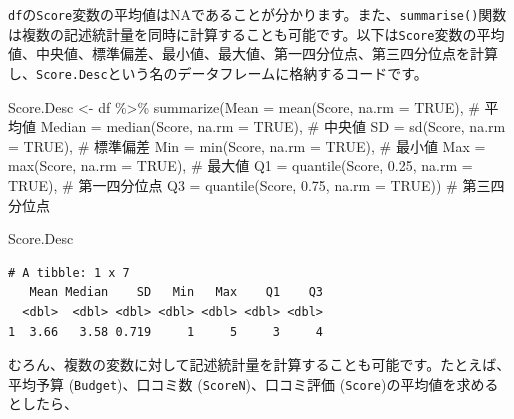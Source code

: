 \documentclass[
  a4paper,
  pandoc,
  ja=standard,
  jafont=haranoaji]{bxjsbook}
\newenvironment{Shaded}{\begin{snugshade}}{\end{snugshade}}
\newcommand{\AttributeTok}[1]{\textcolor[rgb]{0.00,0.48,0.65}{#1}}
\newcommand{\CommentTok}[1]{\textcolor[rgb]{0.37,0.37,0.37}{#1}}
\newcommand{\ConstantTok}[1]{\textcolor[rgb]{0.56,0.35,0.01}{#1}}
\newcommand{\FloatTok}[1]{\textcolor[rgb]{0.68,0.00,0.00}{#1}}
\newcommand{\FunctionTok}[1]{\textcolor[rgb]{0.28,0.35,0.67}{#1}}
\newcommand{\NormalTok}[1]{\textcolor[rgb]{0.00,0.48,0.65}{#1}}
\newcommand{\OtherTok}[1]{\textcolor[rgb]{0.00,0.48,0.65}{#1}}
\newcommand{\SpecialCharTok}[1]{\textcolor[rgb]{0.37,0.37,0.37}{#1}}
\begin{document}
\texttt{df}の\texttt{Score}変数の平均値はNAであることが分かります。また、\texttt{summarise()}関数は複数の記述統計量を同時に計算することも可能です。以下は\texttt{Score}変数の平均値、中央値、標準偏差、最小値、最大値、第一四分位点、第三四分位点を計算し、\texttt{Score.Desc}という名のデータフレームに格納するコードです。

\begin{Shaded}
\begin{Highlighting}[numbers=left,,]
\NormalTok{Score.Desc }\OtherTok{\textless{}{-}}\NormalTok{ df }\SpecialCharTok{\%\textgreater{}\%}
  \FunctionTok{summarize}\NormalTok{(}\AttributeTok{Mean   =}     \FunctionTok{mean}\NormalTok{(Score,       }\AttributeTok{na.rm =} \ConstantTok{TRUE}\NormalTok{),  }\CommentTok{\# 平均値}
            \AttributeTok{Median =}   \FunctionTok{median}\NormalTok{(Score,       }\AttributeTok{na.rm =} \ConstantTok{TRUE}\NormalTok{),  }\CommentTok{\# 中央値}
            \AttributeTok{SD     =}       \FunctionTok{sd}\NormalTok{(Score,       }\AttributeTok{na.rm =} \ConstantTok{TRUE}\NormalTok{),  }\CommentTok{\# 標準偏差}
            \AttributeTok{Min    =}      \FunctionTok{min}\NormalTok{(Score,       }\AttributeTok{na.rm =} \ConstantTok{TRUE}\NormalTok{),  }\CommentTok{\# 最小値}
            \AttributeTok{Max    =}      \FunctionTok{max}\NormalTok{(Score,       }\AttributeTok{na.rm =} \ConstantTok{TRUE}\NormalTok{),  }\CommentTok{\# 最大値}
            \AttributeTok{Q1     =} \FunctionTok{quantile}\NormalTok{(Score, }\FloatTok{0.25}\NormalTok{, }\AttributeTok{na.rm =} \ConstantTok{TRUE}\NormalTok{),  }\CommentTok{\# 第一四分位点}
            \AttributeTok{Q3     =} \FunctionTok{quantile}\NormalTok{(Score, }\FloatTok{0.75}\NormalTok{, }\AttributeTok{na.rm =} \ConstantTok{TRUE}\NormalTok{))  }\CommentTok{\# 第三四分位点}
\end{Highlighting}
\end{Shaded}

\begin{Shaded}
\begin{Highlighting}[numbers=left,,]
\NormalTok{Score.Desc}
\end{Highlighting}
\end{Shaded}

\begin{verbatim}
# A tibble: 1 x 7
   Mean Median    SD   Min   Max    Q1    Q3
  <dbl>  <dbl> <dbl> <dbl> <dbl> <dbl> <dbl>
1  3.66   3.58 0.719     1     5     3     4
\end{verbatim}

むろん、複数の変数に対して記述統計量を計算することも可能です。たとえば、平均予算
(\texttt{Budget})、口コミ数 (\texttt{ScoreN})、口コミ評価
(\texttt{Score})の平均値を求めるとしたら、
\end{document}
